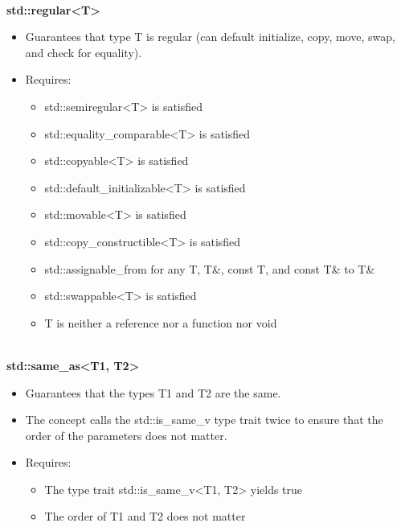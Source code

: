 \noindent
\hspace*{\fill} \\ %
\textbf{std::regular<T>}

\begin{itemize}
\item
Guarantees that type T is regular (can default initialize, copy, move, swap, and check for equality).

\item
Requires:
\begin{itemize}
\item
std::semiregular<T> is satisfied

\item
std::equality\_comparable<T> is satisfied

\item
std::copyable<T> is satisfied

\item
std::default\_initializable<T> is satisfied

\item
std::movable<T> is satisfied

\item
std::copy\_constructible<T> is satisfied

\item
std::assignable\_from for any T, T\&, const T, and const T\& to T\&

\item
std::swappable<T> is satisfied

\item
T is neither a reference nor a function nor void
\end{itemize}
\end{itemize}


\noindent
\hspace*{\fill} \\ %
\textbf{std::same\_as<T1, T2>}

\begin{itemize}
\item
Guarantees that the types T1 and T2 are the same.

\item
The concept calls the std::is\_same\_v type trait twice to ensure that the order of the parameters does not matter.

\item
Requires:
\begin{itemize}
\item
The type trait std::is\_same\_v<T1, T2> yields true

\item
The order of T1 and T2 does not matter
\end{itemize}
\end{itemize}


